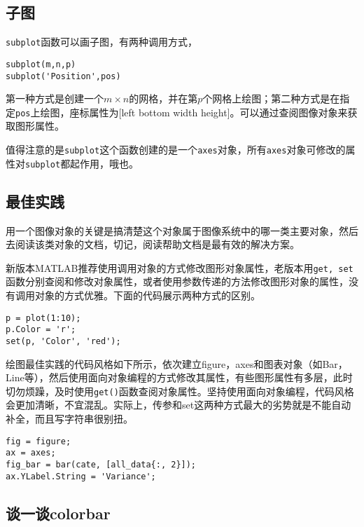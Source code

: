 \subsection{子图}

\texttt{subplot}函数可以画子图，有两种调用方式，

\begin{verbatim}
subplot(m,n,p)
subplot('Position',pos)
\end{verbatim}

第一种方式是创建一个$ m\times n $的网格，并在第$ p $个网格上绘图；第二种方式是在指定\texttt{pos}上绘图，座标属性为[left bottom width height]。可以通过查阅图像对象来获取图形属性。

值得注意的是\texttt{subplot}这个函数创建的是一个\texttt{axes}对象，所有\texttt{axes}对象可修改的属性对\texttt{subplot}都起作用，哦也。

\subsection{最佳实践}

用一个图像对象的关键是搞清楚这个对象属于图像系统中的哪一类主要对象，然后去阅读该类对象的文档，切记，阅读帮助文档是最有效的解决方案。

新版本MATLAB推荐使用调用对象的方式修改图形对象属性，老版本用\texttt{get, set}函数分别查阅和修改对象属性，或者使用参数传递的方法修改图形对象的属性，没有调用对象的方式优雅。下面的代码展示两种方式的区别。

\begin{verbatim}
p = plot(1:10);
p.Color = 'r';
set(p, 'Color', 'red');
\end{verbatim}

绘图最佳实践的代码风格如下所示，依次建立figure，axes和图表对象（如Bar，Line等），然后使用面向对象编程的方式修改其属性，有些图形属性有多层，此时切勿烦躁，及时使用\texttt{get()}函数查阅对象属性。坚持使用面向对象编程，代码风格会更加清晰，不宜混乱。实际上，传参和set这两种方式最大的劣势就是不能自动补全，而且写字符串很别扭。

\begin{verbatim}
fig = figure;
ax = axes;
fig_bar = bar(cate, [all_data{:, 2}]);
ax.YLabel.String = 'Variance';
\end{verbatim}

\subsection{谈一谈colorbar}

